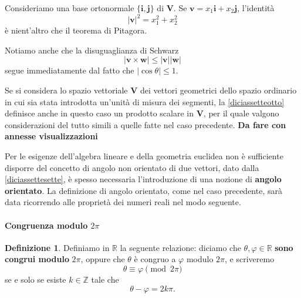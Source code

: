 \documentclass{article}
\theoremstyle{plain}
\theoremstyle{definition}
\newtheorem{defn}{Definizione}[section]
\theoremstyle{remark}
\begin{document}
\vspace{10pt}

Consideriamo una base ortonormale $\{\mathbf{i}, \mathbf{j}\}$ di $\mathbf{V}$. 
Se $\mathbf{v} = x_{1} \mathbf{i} + x_{2} \mathbf{j}$, l'identità
\[
|\mathbf{v}|^{2} = x_{1}^{2} + x_{2}^{2}
\]
è nient'altro che il teorema di Pitagora.

\vspace{10pt}

Notiamo anche che la disuguaglianza di Schwarz
\[
|\mathbf{v} \times \mathbf{w}| \leq |\mathbf{v}| |\mathbf{w}|
\]
segue immediatamente dal fatto che $|\cos \theta| \leq 1$.

\vspace{10pt}

Se si considera lo spazio vettoriale $\mathbf{V}$ dei vettori geometrici dello spazio ordinario in cui sia 
stata introdotta un'unità di misura dei segmenti, la \ref{diciassetteotto} definisce anche in questo caso 
un prodotto scalare in $\mathbf{V}$, per il quale valgono considerazioni del tutto simili a quelle fatte 
nel caso precedente.
\textbf{Da fare con annesse visualizzazioni}

\vspace{10pt}

Per le esigenze dell'algebra lineare e della geometria euclidea non è sufficiente disporre del concetto di 
angolo non orientato di due vettori, dato dalla \ref{diciassettesette}, è spesso necessaria l'introduzione 
di una nozione di \textbf{angolo orientato}. La definizione di angolo orientato, come nel caso precedente, 
sarà data ricorrendo alle proprietà dei numeri reali nel modo seguente.

\vspace{10pt}

\paragraph{Congruenza modulo $2\pi$}
\begin{bxthm}
\begin{defn}
Definiamo in $\mathbb{R}$ la seguente relazione: diciamo che $\theta, \varphi \in \mathbb{R}$ 
\textbf{sono congrui modulo} $2\pi$, oppure che $\theta$ è congruo a $\varphi$ modulo $2\pi$, e 
scriveremo 
\[
\theta \equiv \varphi \pmod{2\pi}
\]
se e solo se esiste $k \in \mathbb{Z}$ tale che 
\[
\theta - \varphi = 2k\pi.
\]    
\end{defn}
\end{bxthm}
\end{document}
